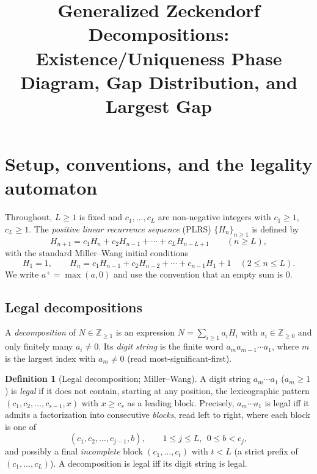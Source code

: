 \documentclass[12pt]{article}
\theoremstyle{definition}
\newtheorem{definition}{Definition}
\newcommand{\Z}{\mathbb{Z}}
\begin{document}
\title{Generalized Zeckendorf Decompositions:\\ Existence/Uniqueness Phase Diagram, Gap Distribution, and Largest Gap}
\author{}
\date{}
\maketitle

\section{Setup, conventions, and the legality automaton}

Throughout, $L\ge1$ is fixed and $c_1,\dots,c_L$ are non-negative integers with
$c_1\ge1$, $c_L\ge1$. The \emph{positive linear recurrence sequence} (PLRS)
$\{H_n\}_{n\ge1}$ is defined by
\begin{equation}\label{eq:rec}
H_{n+1}=c_1H_n+c_2H_{n-1}+\cdots+c_LH_{n-L+1}\qquad(n\ge L),
\end{equation}
with the standard Miller--Wang initial conditions
\begin{equation}\label{eq:init}
H_1=1,\qquad H_n=c_1H_{n-1}+c_2H_{n-2}+\cdots+c_{n-1}H_1+1\quad(2\le n\le L).
\end{equation}
We write $a^+=\max(a,0)$ and use the convention that an empty sum is $0$.

\subsection{Legal decompositions}
A \emph{decomposition} of $N\in\Z_{\ge1}$ is an expression
$N=\sum_{i\ge1}a_iH_i$ with $a_i\in\Z_{\ge0}$ and only finitely many $a_i\neq0$.
Its \emph{digit string} is the finite word $a_m a_{m-1}\cdots a_1$, where
$m$ is the largest index with $a_m\neq0$ (read most-significant-first).

\begin{definition}[Legal decomposition; Miller--Wang]\label{def:legal}
A digit string $a_m\cdots a_1$ ($a_m\ge1$) is \emph{legal} if it does not
contain, starting at any position, the lexicographic pattern
$(c_1,c_2,\dots,c_{s-1},x)$ with $x\ge c_s$ as a leading block. Precisely,
$a_m\cdots a_1$ is legal iff it admits a factorization into consecutive
\emph{blocks}, read left to right, where each block is one of
\begin{equation}\label{eq:blocks}
(c_1,c_2,\dots,c_{j-1},b),\qquad 1\le j\le L,\ \ 0\le b<c_j ,
\end{equation}
and possibly a final \emph{incomplete} block $(c_1,\dots,c_t)$ with $t<L$
(a strict prefix of $(c_1,\dots,c_L)$). A decomposition is legal iff its digit
string is legal.
\end{definition}
\end{document}
